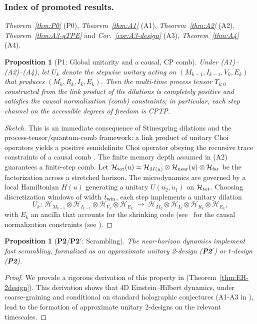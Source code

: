 \documentclass[11pt,a4paper]{article}
\newcommand{\Ptwo}{\textbf{P2}\xspace}
\newcommand{\PtwoPrime}{\textbf{P2$'$}\xspace}
\theoremstyle{plain}
\newtheorem{proposition}[theorem]{Proposition}
\theoremstyle{definition}
\theoremstyle{remark}
\begin{document}
\subsubsection{Index of promoted results.}
\textit{Theorem~\ref{thm:P0}} (P0), 
\textit{Theorem~\ref{thm:A1}} (A1),
\textit{Theorem~\ref{thm:A2}} (A2),
\textit{Theorem~\ref{thm:A3-qTPE}} and \textit{Cor.~\ref{cor:A3-design}} (A3),
\textit{Theorem~\ref{thm:A4}} (A4).


\begin{proposition}[P1: Global unitarity and a causal, CP comb]
\label{prop:P1-CP}
Under (A1)--(A2)--(A4), let $U_k$ denote the stepwise unitary acting on $(M_{k-1},I_{k-1},V_k,E_k)$ that produces $(M_k,R_k,I_k,E_k)$.
Then the multi-time process tensor $\Upsilon_{k:0}$ constructed from the link product of the dilations is completely positive and
satisfies the causal normalization (comb) constraints; in particular, each step channel on the accessible degrees of freedom is CPTP.
\end{proposition}
\begin{proof}[Sketch]
This is an immediate consequence of Stinespring dilations and the process-tensor/quantum-comb framework: a link product of unitary
Choi operators yields a positive semidefinite Choi operator obeying the recursive trace constraints of a causal comb
\cite{Chiribella:2009, Pollock:2018, Petz:1986}. The finite memory depth assumed in (A2) guarantees a finite-step comb.
Let $\mathcal{H}_{\rm tot}(u)=\mathcal{H}_{M(u)}\otimes\mathcal{H}_{\rm near}(u)\otimes\mathcal{H}_{\rm far}$ be the factorization across a stretched horizon. The microdynamics are governed by a local Hamiltonian $H(u)$ generating a unitary $U(u_2,u_1)$ on $\mathcal{H}_{\rm tot}$. Choosing discretization windows of width $t_{\rm win}$, each step implements a unitary dilation
\begin{equation}
U_k:\ \mathcal{H}_{M_{k-1}}\otimes\mathcal{H}_{I_{k-1}}\otimes\mathcal{H}_{V_k}\otimes\mathcal{H}_{E_k}
\;\longrightarrow\;
\mathcal{H}_{M_k}\otimes\mathcal{H}_{I_k}\otimes\mathcal{H}_{R_k}\otimes\mathcal{H}_{E_k},
\end{equation}
with $E_k$ an ancilla that accounts for the shrinking code (see~ for the causal normalization constraints (see ).
\end{proof}

\begin{proposition}[\Ptwo/\PtwoPrime: Scrambling]
\label{thm:P2-scrambling}
\label{prop:P2-scrambling}
The near-horizon dynamics implement fast scrambling, formalized as an approximate unitary 2-design (\PtwoPrime) or $t$-design (\Ptwo).
\end{proposition}
\begin{proof}
We provide a rigorous derivation of this property in  (Theorem~\ref{thm:EH-2design}). This derivation shows that 4D Einstein--Hilbert dynamics, under coarse-graining and conditional on standard holographic conjectures (A1-A3 in ), lead to the formation of approximate unitary 2-designs on the relevant timescales.
\end{proof}
\end{document}
